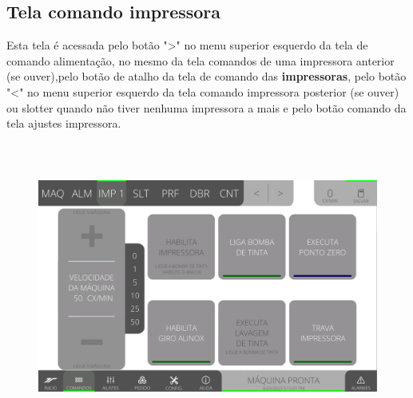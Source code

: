 \thispagestyle{fancy}
\vspace*{40 pt}
\subsection{Tela comando impressora}\label{miniTelaComandoImpressora}
 Esta tela é acessada pelo botão "\textgreater" no menu superior esquerdo da tela de comando alimentação, no mesmo da tela comandos de uma impressora anterior (se ouver),pelo botão de atalho da tela de comando das
\textbf{impressoras}, pelo botão "\textless{}" no menu superior esquerdo da tela comando impressora posterior (se ouver) ou slotter quando não tiver nenhuma impressora a mais e pelo botão comando da tela ajustes impressora.
\vspace*{\fill}
\begin{figure}[h]
  \centering
  \includegraphics[width=576px,height=360px]{src/imagesMiniline/04-Printer/commands/e0.png}
\end{figure}
\vspace*{\fill}


